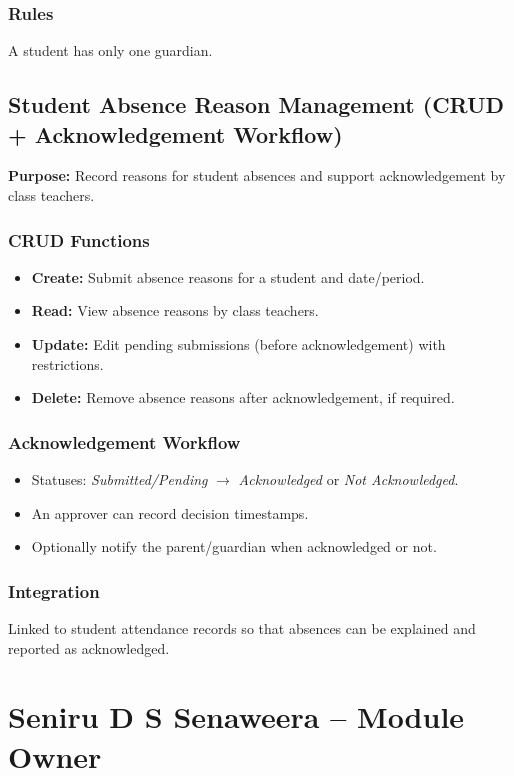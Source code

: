 \documentclass[12pt, a4paper]{report}
\begin{document}
\subsubsection*{Rules}
A student has only one guardian.

\subsection{Student Absence Reason Management (CRUD + Acknowledgement Workflow)}
\textbf{Purpose:} Record reasons for student absences and support acknowledgement by class teachers.

\subsubsection*{CRUD Functions}
\begin{itemize}[leftmargin=*]
  \item \textbf{Create:} Submit absence reasons for a student and date/period.
  \item \textbf{Read:} View absence reasons by class teachers.
  \item \textbf{Update:} Edit pending submissions (before acknowledgement) with restrictions.
  \item \textbf{Delete:} Remove absence reasons after acknowledgement, if required.
\end{itemize}

\subsubsection*{Acknowledgement Workflow}
\begin{itemize}[leftmargin=*]
  \item Statuses: \textit{Submitted/Pending} $\rightarrow$ \textit{Acknowledged} or \textit{Not Acknowledged}.
  \item An approver can record decision timestamps.
  \item Optionally notify the parent/guardian when acknowledged or not.
\end{itemize}

\subsubsection*{Integration}
Linked to student attendance records so that absences can be explained and reported as acknowledged.

\section{Seniru D S Senaweera -- Module Owner}
\end{document}
